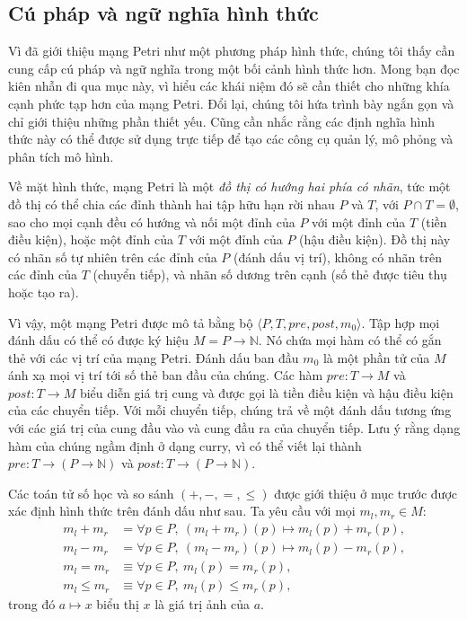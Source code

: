
\subsection{Cú pháp và ngữ nghĩa hình thức}
Vì đã giới thiệu mạng Petri như một phương pháp hình thức, chúng tôi thấy cần cung cấp cú pháp và ngữ nghĩa trong một bối cảnh hình thức hơn. Mong bạn đọc kiên nhẫn đi qua mục này, vì hiểu các khái niệm đó sẽ cần thiết cho những khía cạnh phức tạp hơn của mạng Petri. Đổi lại, chúng tôi hứa trình bày ngắn gọn và chỉ giới thiệu những phần thiết yếu. Cũng cần nhắc rằng các định nghĩa hình thức này có thể được sử dụng trực tiếp để tạo các công cụ quản lý, mô phỏng và phân tích mô hình.

Về mặt hình thức, mạng Petri là một \emph{đồ thị có hướng hai phía có nhãn}, tức một đồ thị có thể chia các đỉnh thành hai tập hữu hạn rời nhau $P$ và $T$, với $P\cap T=\emptyset$, sao cho mọi cạnh đều có hướng và nối một đỉnh của $P$ với một đỉnh của $T$ (tiền điều kiện), hoặc một đỉnh của $T$ với một đỉnh của $P$ (hậu điều kiện). Đồ thị này có nhãn số tự nhiên trên các đỉnh của $P$ (đánh dấu vị trí), không có nhãn trên các đỉnh của $T$ (chuyển tiếp), và nhãn số dương trên cạnh (số thẻ được tiêu thụ hoặc tạo ra).

Vì vậy, một mạng Petri được mô tả bằng bộ $\langle P,T,pre,post,m_0\rangle$. Tập hợp mọi đánh dấu có thể có được ký hiệu $M=P\to\mathbb{N}$. Nó chứa mọi hàm có thể có gắn thẻ với các vị trí của mạng Petri. Đánh dấu ban đầu $m_0$ là một phần tử của $M$ ánh xạ mọi vị trí tới số thẻ ban đầu của chúng. Các hàm $pre:T\to M$ và $post:T\to M$ biểu diễn giá trị cung và được gọi là tiền điều kiện và hậu điều kiện của các chuyển tiếp. Với mỗi chuyển tiếp, chúng trả về một đánh dấu tương ứng với các giá trị của cung đầu vào và cung đầu ra của chuyển tiếp. Lưu ý rằng dạng hàm của chúng ngầm định ở dạng curry, vì có thể viết lại thành $pre:T\to(P\to\mathbb{N})$ và $post:T\to(P\to\mathbb{N})$.

Các toán tử số học và so sánh $(+,-,=,\leqslant)$ được giới thiệu ở mục trước được xác định hình thức trên đánh dấu như sau. Ta yêu cầu với mọi $m_l,m_r\in M$:
\[
\begin{aligned}
m_l+m_r&=\forall p\in P,\ (m_l+m_r)(p)\mapsto m_l(p)+m_r(p),\\
m_l-m_r&=\forall p\in P,\ (m_l-m_r)(p)\mapsto m_l(p)-m_r(p),\\
m_l=m_r&\equiv\forall p\in P,\ m_l(p)=m_r(p),\\
m_l\leqslant m_r&\equiv\forall p\in P,\ m_l(p)\leqslant m_r(p),
\end{aligned}
\]
trong đó $a\mapsto x$ biểu thị $x$ là giá trị ảnh của $a$.


